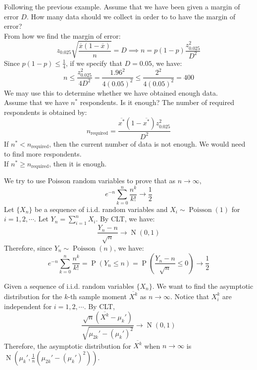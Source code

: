 \documentclass{huhtakm-template-book-v2}
\DeclareMathOperator{\prob}{P}
\DeclareMathOperator{\Poisson}{Poisson}
\DeclareMathOperator{\N}{N}
\begin{document}
\newpage
\begin{eg}
	Following the previous example. Assume that we have been given a margin of error $D$. How many data should we collect in order to to have the margin of error?\\
	From how we find the margin of error:
	\begin{equation*}
		z_{0.025}\sqrt{\frac{\overline{x}(1-\overline{x})}{n}}=D\implies n=p(1-p)\frac{z_{0.025}^{2}}{D^{2}}
	\end{equation*}
	Since $p(1-p)\leq\frac{1}{4}$, if we specify that $D=0.05$, we have:
	\begin{equation*}
		n\leq\frac{z_{0.025}^{2}}{4D^{2}}=\frac{1.96^{2}}{4(0.05)^{2}}\leq\frac{2^{2}}{4(0.05)^{2}}=400
	\end{equation*}
	We may use this to determine whether we have obtained enough data.\\
	Assume that we have $n^{*}$ respondents. Is it enough? The number of required respondents is obtained by:
	\begin{equation*}
		n_{\text{required}}=\frac{\overline{x^{*}}(1-\overline{x^{*}})z_{0.025}^{2}}{D^{2}}
	\end{equation*}
	If $n^{*}<n_{\text{required}}$, then the current number of data is not enough. We would need to find more respondents.\\
	If $n^{*}\geq n_{\text{required}}$, then it is enough.
\end{eg}
\begin{eg}
	We try to use Poisson random variables to prove that as $n\to\infty$,
	\begin{equation*}
		e^{-n}\sum_{k=0}^{n}\frac{n^{k}}{k!}\to\frac{1}{2}
	\end{equation*}
	Let $\{X_{n}\}$ be a sequence of i.i.d. random variables and $X_{i}\sim\Poisson(1)$ for $i=1,2,\cdots$. Let $Y_{n}=\sum_{i=1}^{n}X_{i}$. By CLT, we have:
	\begin{equation*}
		\frac{Y_{n}-n}{\sqrt{n}}\to\N(0,1)
	\end{equation*}
	Therefore, since $Y_{n}\sim\Poisson(n)$, we have:
	\begin{equation*}
		e^{-n}\sum_{k=0}^{n}\frac{n^{k}}{k!}=\prob(Y_{n}\leq n)=\prob(\frac{Y_{n}-n}{\sqrt{n}}\leq 0)\to\frac{1}{2}
	\end{equation*}
\end{eg}
\begin{eg}
	Given a sequence of i.i.d. random variables $\{X_{n}\}$. We want to find the asymptotic distribution for the $k$-th sample moment $\overline{X^{k}}$ as $n\to\infty$. Notice that $X_{i}^{k}$ are independent for $i=1,2,\cdots$. By CLT,
	\begin{equation*}
		\frac{\sqrt{n}(\overline{X^{k}}-\mu_{k}')}{\sqrt{\mu_{2k}'-(\mu_{k}')^{2}}}\to\N(0,1)
	\end{equation*}
	Therefore, the asymptotic distribution for $\overline{X^{k}}$ when $n\to\infty$ is $\N(\mu_{k}',\frac{1}{n}(\mu_{2k}'-(\mu_{k}')^{2}))$.
\end{eg}
\end{document}
